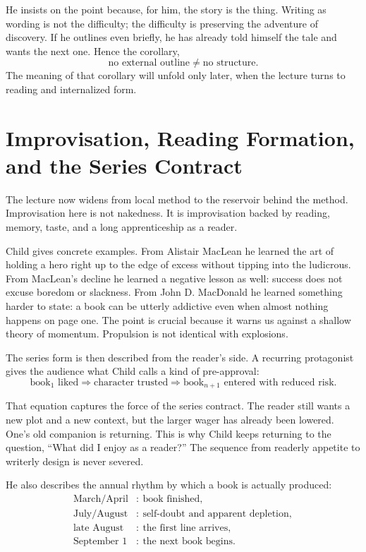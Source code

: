 He insists on the point because, for him, the story is the thing. Writing as wording is not the difficulty; the difficulty is preserving the adventure of discovery. If he outlines even briefly, he has already told himself the tale and wants the next one. Hence the corollary,
\begin{equation}
\text{no external outline} \neq \text{no structure}.
\end{equation}
The meaning of that corollary will unfold only later, when the lecture turns to reading and internalized form.

\section{Improvisation, Reading Formation, and the Series Contract}

The lecture now widens from local method to the reservoir behind the method. Improvisation here is not nakedness. It is improvisation backed by reading, memory, taste, and a long apprenticeship as a reader.

Child gives concrete examples. From Alistair MacLean he learned the art of holding a hero right up to the edge of excess without tipping into the ludicrous. From MacLean's decline he learned a negative lesson as well: success does not excuse boredom or slackness. From John D. MacDonald he learned something harder to state: a book can be utterly addictive even when almost nothing happens on page one. The point is crucial because it warns us against a shallow theory of momentum. Propulsion is not identical with explosions.

The series form is then described from the reader's side. A recurring protagonist gives the audience what Child calls a kind of pre-approval:
\begin{equation}
\text{book}_1 \text{ liked} \Longrightarrow \text{character trusted} \Longrightarrow \text{book}_{n+1} \text{ entered with reduced risk}.
\end{equation}

That equation captures the force of the series contract. The reader still wants a new plot and a new context, but the larger wager has already been lowered. One's old companion is returning. This is why Child keeps returning to the question, ``What did I enjoy as a reader?'' The sequence from readerly appetite to writerly design is never severed.

He also describes the annual rhythm by which a book is actually produced:
\begin{align}
\text{March/April} &:\ \text{book finished},\\
\text{July/August} &:\ \text{self-doubt and apparent depletion},\\
\text{late August} &:\ \text{the first line arrives},\\
\text{September 1} &:\ \text{the next book begins}.
\end{align}

